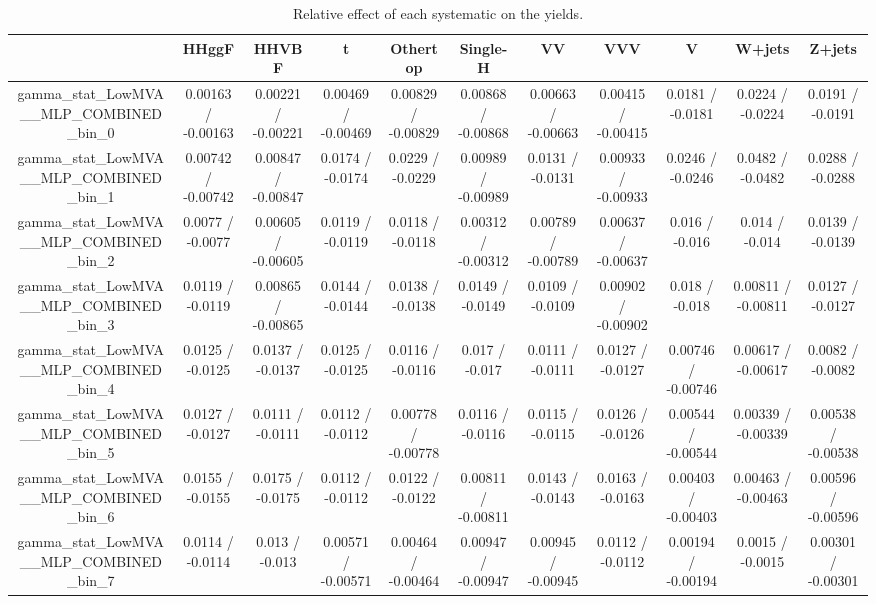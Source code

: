 \documentclass[10pt]{article}
\begin{document}
\begin{table}[htbp]
\begin{center}
\begin{tabular}{|c|c|c|c|c|c|c|c|c|c|c|}
\hline 
      & HHggF      & HHVBF      & t      & Othertop      & Single-H      & VV      & VVV      & V      & W+jets      & Z+jets \\ 
\hline 
  gamma_stat_LowMVA__MLP_COMBINED_bin_0 & 0.00163 / -0.00163 & 0.00221 / -0.00221 & 0.00469 / -0.00469 & 0.00829 / -0.00829 & 0.00868 / -0.00868 & 0.00663 / -0.00663 & 0.00415 / -0.00415 & 0.0181 / -0.0181 & 0.0224 / -0.0224 & 0.0191 / -0.0191 \\ 
  gamma_stat_LowMVA__MLP_COMBINED_bin_1 & 0.00742 / -0.00742 & 0.00847 / -0.00847 & 0.0174 / -0.0174 & 0.0229 / -0.0229 & 0.00989 / -0.00989 & 0.0131 / -0.0131 & 0.00933 / -0.00933 & 0.0246 / -0.0246 & 0.0482 / -0.0482 & 0.0288 / -0.0288 \\ 
  gamma_stat_LowMVA__MLP_COMBINED_bin_2 & 0.0077 / -0.0077 & 0.00605 / -0.00605 & 0.0119 / -0.0119 & 0.0118 / -0.0118 & 0.00312 / -0.00312 & 0.00789 / -0.00789 & 0.00637 / -0.00637 & 0.016 / -0.016 & 0.014 / -0.014 & 0.0139 / -0.0139 \\ 
  gamma_stat_LowMVA__MLP_COMBINED_bin_3 & 0.0119 / -0.0119 & 0.00865 / -0.00865 & 0.0144 / -0.0144 & 0.0138 / -0.0138 & 0.0149 / -0.0149 & 0.0109 / -0.0109 & 0.00902 / -0.00902 & 0.018 / -0.018 & 0.00811 / -0.00811 & 0.0127 / -0.0127 \\ 
  gamma_stat_LowMVA__MLP_COMBINED_bin_4 & 0.0125 / -0.0125 & 0.0137 / -0.0137 & 0.0125 / -0.0125 & 0.0116 / -0.0116 & 0.017 / -0.017 & 0.0111 / -0.0111 & 0.0127 / -0.0127 & 0.00746 / -0.00746 & 0.00617 / -0.00617 & 0.0082 / -0.0082 \\ 
  gamma_stat_LowMVA__MLP_COMBINED_bin_5 & 0.0127 / -0.0127 & 0.0111 / -0.0111 & 0.0112 / -0.0112 & 0.00778 / -0.00778 & 0.0116 / -0.0116 & 0.0115 / -0.0115 & 0.0126 / -0.0126 & 0.00544 / -0.00544 & 0.00339 / -0.00339 & 0.00538 / -0.00538 \\ 
  gamma_stat_LowMVA__MLP_COMBINED_bin_6 & 0.0155 / -0.0155 & 0.0175 / -0.0175 & 0.0112 / -0.0112 & 0.0122 / -0.0122 & 0.00811 / -0.00811 & 0.0143 / -0.0143 & 0.0163 / -0.0163 & 0.00403 / -0.00403 & 0.00463 / -0.00463 & 0.00596 / -0.00596 \\ 
  gamma_stat_LowMVA__MLP_COMBINED_bin_7 & 0.0114 / -0.0114 & 0.013 / -0.013 & 0.00571 / -0.00571 & 0.00464 / -0.00464 & 0.00947 / -0.00947 & 0.00945 / -0.00945 & 0.0112 / -0.0112 & 0.00194 / -0.00194 & 0.0015 / -0.0015 & 0.00301 / -0.00301 \\ 
\hline 
\end{tabular} 
\caption{Relative effect of each systematic on the yields.} 
\end{center} 
\end{table} 
\end{document}
